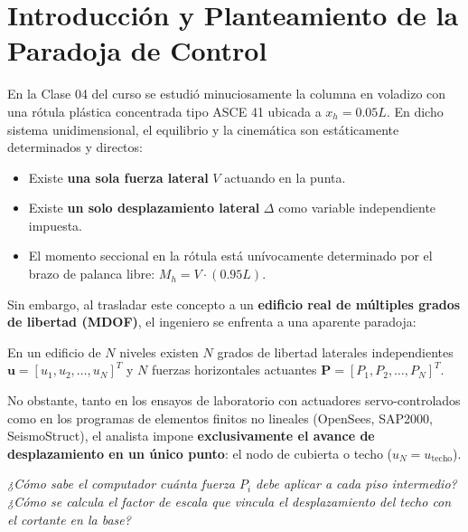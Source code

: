 \documentclass[11pt,letterpaper]{article}
\begin{document}
\section{Introducción y Planteamiento de la Paradoja de Control}

En la Clase 04 del curso se estudió minuciosamente la columna en voladizo con una rótula plástica concentrada tipo ASCE 41 ubicada a $x_h = 0.05 L$. En dicho sistema unidimensional, el equilibrio y la cinemática son estáticamente determinados y directos:
\begin{itemize}
    \item Existe \textbf{una sola fuerza lateral} $V$ actuando en la punta.
    \item Existe \textbf{un solo desplazamiento lateral} $\Delta$ como variable independiente impuesta.
    \item El momento seccional en la rótula está unívocamente determinado por el brazo de palanca libre: $M_h = V \cdot (0.95 L)$.
\end{itemize}

Sin embargo, al trasladar este concepto a un \textbf{edificio real de múltiples grados de libertad (MDOF)}, el ingeniero se enfrenta a una aparente paradoja:

\begin{conceptbox}
En un edificio de $N$ niveles existen $N$ grados de libertad laterales independientes $\mathbf{u} = [u_1, u_2, \dots, u_N]^T$ y $N$ fuerzas horizontales actuantes $\mathbf{P} = [P_1, P_2, \dots, P_N]^T$. 

No obstante, tanto en los ensayos de laboratorio con actuadores servo-controlados como en los programas de elementos finitos no lineales (OpenSees, SAP2000, SeismoStruct), el analista impone \textbf{exclusivamente el avance de desplazamiento en un único punto}: el nodo de cubierta o techo ($u_N = u_{\text{techo}}$).

\begin{center}
    \textit{¿Cómo sabe el computador cuánta fuerza $P_i$ debe aplicar a cada piso intermedio?} \\
    \textit{¿Cómo se calcula el factor de escala que vincula el desplazamiento del techo con el cortante en la base?}
\end{center}
\end{conceptbox}
\end{document}
